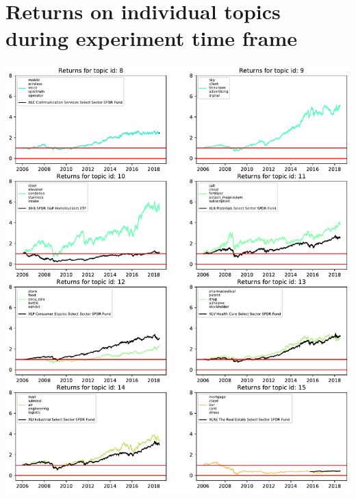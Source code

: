 \documentclass[12pt,journal,letterpaper,oneside,onecolumn]{IEEEtran}
\begin{document}
\section{Returns on individual topics during experiment time frame}
\begin{center}
\includegraphics[width=1\linewidth]{images/returns_per_topic_page_1.pdf}
\end{center}
\end{document}
